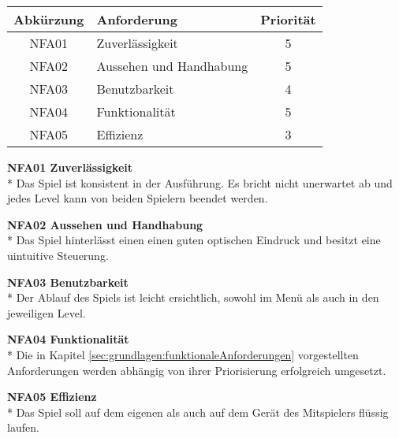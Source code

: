 \begin{center}
    \label{tab:grundlagen:nichtFunktionaleAnforderungen}
    \begin{tabular}{ c | l | c}
        Abkürzung & Anforderung & Priorität\\
        \hline
        NFA01 & Zuverlässigkeit & 5 \\
        \hline
        NFA02 & Aussehen und Handhabung & 5 \\
        \hline
        NFA03 & Benutzbarkeit & 4 \\
        \hline
        NFA04 & Funktionalität & 5 \\
        \hline
        NFA05 & Effizienz & 3 \\
    \end{tabular}
\end{center}

\textbf{NFA01 Zuverlässigkeit}\\*
Das Spiel ist konsistent in der Ausführung. Es bricht nicht unerwartet ab und jedes Level kann von beiden Spielern beendet werden.

\textbf{NFA02 Aussehen und Handhabung}\\*
Das Spiel hinterlässt einen einen guten optischen Eindruck und besitzt eine uintuitive Steuerung.

\textbf{NFA03 Benutzbarkeit}\\*
Der Ablauf des Spiels ist leicht ersichtlich, sowohl im Menü als auch in den jeweiligen Level.

\textbf{NFA04 Funktionalität}\\*
Die in Kapitel \ref{sec:grundlagen:funktionaleAnforderungen} vorgestellten Anforderungen werden abhängig von ihrer Priorisierung erfolgreich umgesetzt.

\textbf{NFA05 Effizienz}\\*
Das Spiel soll auf dem eigenen als auch auf dem Gerät des Mitspielers flüssig laufen. 



